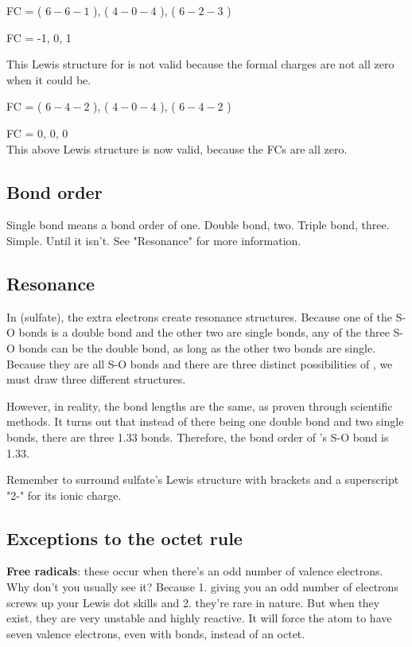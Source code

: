 \documentclass[letterpaper, 12pt]{article}
\begin{document}
	
	FC = ( $6 - 6 - 1$ ), ( $4 - 0 - 4$ ), ( $6 - 2 - 3$ )
	
	FC = -1, 0, 1
	
	This Lewis structure for  is not valid because the formal charges are not all zero when it could be.\\
	
	
	FC = ( $6 - 4 - 2$ ), ( $4 - 0 - 4$ ), ( $6 - 4 - 2$ )
	
	FC = 0, 0, 0\\
	
	This above Lewis structure is now valid, because the FCs are all zero.
	
	\subsection{Bond order}
	Single bond means a bond order of one. Double bond, two. Triple bond, three. Simple. Until it isn't. See "Resonance" for more information.
	
	\subsection{Resonance}
	In  (sulfate), the extra electrons create resonance structures. Because one of the S-O bonds is a double bond and the other two are single bonds, any of the three S-O bonds can be the double bond, as long as the other two bonds are single. Because they are all S-O bonds and there are three distinct possibilities of , we must draw three different structures.
	
	However, in reality, the  bond lengths are the same, as proven through scientific methods. It turns out that instead of there being one double bond and two single bonds, there are three 1.33 bonds. Therefore, the bond order of 's S-O bond is 1.33.
	
	Remember to surround sulfate's Lewis structure with brackets and a superscript "2-" for its ionic charge.
	
	\subsection{Exceptions to the octet rule}
	\textbf{Free radicals}: these occur when there's an odd number of valence electrons. Why don't you usually see it? Because 1. giving you an odd number of electrons screws up your Lewis dot skills and 2. they're rare in nature. But when they exist, they are very unstable and highly reactive. It will force the atom to have seven valence electrons, even with bonds, instead of an octet.
	
\end{document}
